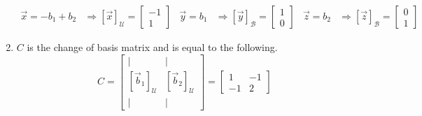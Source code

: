 \begin{SaveQuestion}
\begin{enumerate}
$$\begin{array}{rlrlrl}
            \vec x = -b_1 + b_2 &\Longrightarrow [\vec x]_{\mathcal U} =  \begin{bmatrix} -1 \\ 1 \end{bmatrix} & \vec y = b_1 &\Longrightarrow [\vec y]_{\mathcal B} =  \begin{bmatrix} 1 \\ 0 \end{bmatrix} & \vec z = b_2 &\Longrightarrow [\vec z]_{\mathcal B} =  \begin{bmatrix} 0 \\ 1 \end{bmatrix} 
        \end{array}$$
        \item $C$ is the change of basis matrix and is equal to the following.
        $$C = \begin{bmatrix} | & | \\ [\vec b_1]_{\mathcal U} & [\vec b_2]_{\mathcal U} \\ | & | \end{bmatrix} = \begin{bmatrix} 1 & -1 \\-1 & 2 \end{bmatrix}$$
     \end{enumerate}
\end{SaveQuestion}



